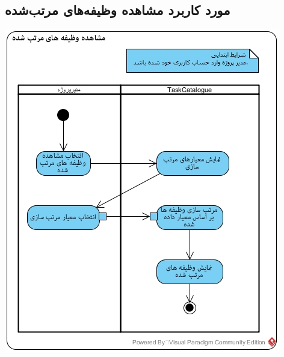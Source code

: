 \subsection*{مورد کاربرد مشاهده وظیفه‌های مرتب‌شده}
\vspace{2cm}
\begin{center}
\includegraphics[width=\textwidth]{ActivityDiagramsWithSwimlanes/20.jpg}
\end{center}

\newpage
\vspace{2cm}
